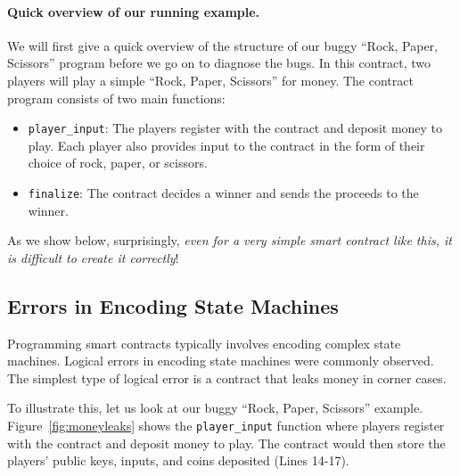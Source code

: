 \documentclass{llncs}
\newcommand{\elaine}[1]{}
\newcommand{\ignore}[1]{}
\begin{document}
\paragraph{Quick overview of our running example.}
We will first give a quick overview of the structure
of our buggy ``Rock, Paper, Scissors'' program before
we go on to diagnose the bugs.
In this contract, two players 
will play a simple 
``Rock, Paper, Scissors''
for money. 
The contract program consists of two main functions:
\begin{itemize}
\item
{\tt player\_input}:
The players register with the contract
and deposit money to play. Each player 
also provides input to the contract 
in the form of their choice of rock, paper, or scissors.
\item
{\tt finalize}:
The contract decides a winner
and sends the proceeds to the winner. 
\end{itemize}

As we show below, 
surprisingly, {\it even for a very simple smart contract like this, 
it is difficult 
to create it correctly}!

\elaine{emphasize this in the intro too.}


\ignore{
In this section, we'll explore the security and incentive alignment pitfalls in designing a smart contract. We'll use an easy-to-understand application as a running example, based on a Rock-Paper-Scissors game. We then analyze a plausible (but subtly buggy) initial implementation, pointing out its flaws. Mistakes resembling these were actually observed in our Smart Contract Programming Lab in ``CMSC 414 - Undergraduate Security''. This section is centered around the exercises. We provide hints to guide the reader towards discovering how to improve on them. Our ``reference'' solution can be found in the accompanying materials.
}


\subsection{Errors in Encoding State Machines}

Programming smart contracts typically involves
encoding complex state machines.
Logical errors
in encoding state machines were commonly observed.
The simplest type of logical error is a contract
that leaks money in corner cases.


To illustrate this, let us look at our buggy
``Rock, Paper, Scissors'' example.
Figure~\ref{fig:moneyleaks}
shows the {\tt player\_input} function
where players register with the contract and  
deposit money to play.
The contract would then store the players'
public keys, inputs,
and coins deposited (Lines 14-17).
\end{document}
